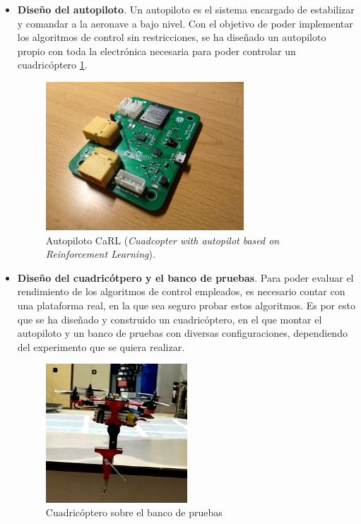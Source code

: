 \begin{itemize}
	\item \textbf{Diseño del autopiloto}. Un autopiloto es el sistema encargado de estabilizar y comandar a la aeronave a bajo nivel. Con el objetivo de poder implementar los algoritmos de control sin restricciones, se ha diseñado un autopiloto propio con toda la electrónica necesaria para poder controlar un cuadricóptero \cref{hardware:carl_board}.  

\newpage

\begin{figure}[htb!]
	\centering
	\includegraphics[width=0.7\textwidth]{hardware/carl_board}
	\caption{Autopiloto CaRL (\textit{Cuadcopter with autopilot based on Reinforcement Learning}).}
	\label{hardware:carl_board}	

\end{figure}
	
	\item \textbf{Diseño del cuadricótpero y el banco de pruebas}. Para poder evaluar el rendimiento de los algoritmos de control empleados, es necesario contar con una plataforma real, en la que sea seguro probar estos algoritmos. Es por esto que se ha diseñado y construido un cuadricóptero, en el que montar el autopiloto y un banco de pruebas con diversas configuraciones, dependiendo del experimento que se quiera realizar.\\

	
	\begin{figure}[htb!]
		\centering
		\includegraphics[width=0.5\textwidth]{abstract/drone}
		\caption{Cuadricóptero sobre el banco de pruebas}
		\label{Drone_en_X}
	\end{figure}


\end{itemize}
